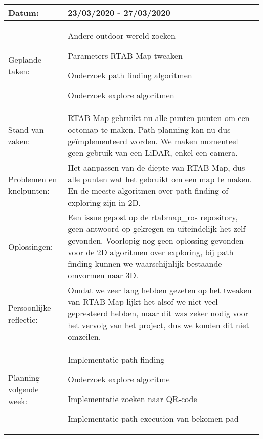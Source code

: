 \begin{tabularx}{\textwidth}{| l | X |}
  \hline
  Datum: & 23/03/2020 - 27/03/2020\\
  \hline
  Geplande taken: &
  \begin{compactitem}
    \item Andere outdoor wereld zoeken
    \item Parameters RTAB-Map tweaken
    \item Onderzoek path finding algoritmen
    \item Onderzoek explore algoritmen
  \end{compactitem}\\
  \hline
  Stand van zaken: & RTAB-Map gebruikt nu alle punten punten om een octomap te maken. Path planning kan nu dus ge\"implementeerd worden. We maken momenteel geen gebruik van een LiDAR, enkel een camera.\\
  \hline
  Problemen en knelpunten: & Het aanpassen van de diepte van RTAB-Map, dus alle punten wat het gebruikt om een map te maken. En de meeste algoritmen over path finding of exploring zijn in 2D.\\
  \hline
  Oplossingen: & Een issue gepost op de rtabmap\_ros repository, geen antwoord op gekregen en uiteindelijk het zelf gevonden. Voorlopig nog geen oplossing gevonden voor de 2D algoritmen over exploring, bij path finding kunnen we waarschijnlijk bestaande omvormen naar 3D.\\
  \hline
  Persoonlijke reflectie: & Omdat we zeer lang hebben gezeten op het tweaken van RTAB-Map lijkt het alsof we niet veel gepresteerd hebben, maar dit was zeker nodig voor het vervolg van het project, dus we konden dit niet omzeilen.\\
  \hline
  Planning volgende week: &
  \begin{compactitem}
    \item Implementatie path finding
    \item Onderzoek explore algoritme
    \item Implementatie zoeken naar QR-code
    \item Implementatie path execution van bekomen pad
  \end{compactitem}\\
  \hline
\end{tabularx}